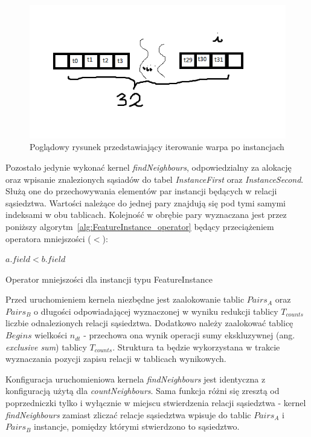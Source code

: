 \documentclass[12pt]{article}
\begin{document}
\begin{figure}[H]
\centering
\includegraphics{planesweep}
\caption{Poglądowy rysunek przedstawiający iterowanie warpa po instancjach}
\end{figure}

Pozostało jedynie wykonać kernel \textit{findNeighbours}, odpowiedzialny za alokację oraz wpisanie znalezionych sąsiadów do tabel \textit{InstanceFirst} oraz \textit{InstanceSecond}. Służą one do przechowywania elementów par instancji będących w relacji sąsiedztwa. Wartości należące do jednej pary znajdują się pod tymi samymi indeksami w obu tablicach. Kolejność w obrębie pary wyznaczana jest przez poniższy algorytm~\ref{alg:FeatureInstance_operator} będący przeciążeniem operatora mniejszości ($ < $):

\begin{algorithm}
 \Return $ a.field < b.field $ \;
\caption{Operator mniejszości dla instancji typu FeatureInstance}
\label{alg:FeatureInstance_operator}
\end{algorithm}

Przed uruchomieniem kernela niezbędne jest zaalokowanie tablic $ Pairs_{A} $ oraz $ Pairs_{B}$ o długości odpowiadającej wyznaczonej w wyniku redukcji tablicy $ T_{counts} $ liczbie odnalezionych relacji sąsiedztwa. Dodatkowo należy zaalokować tablicę $ Begins $ wielkości $ n_{dt} $ - przechowa ona wynik operacji sumy ekskluzywnej (ang. \textit{exclusive sum}) tablicy $ T_{counts} $. Struktura ta będzie wykorzystana w trakcie wyznaczania pozycji zapisu relacji w tablicach wynikowych.

Konfiguracja uruchomieniowa kernela \textit{findNeighbours} jest identyczna z konfiguracją użytą dla \textit{countNeighbours}. Sama funkcja różni się zresztą od poprzedniczki tylko i wyłącznie w miejscu stwierdzenia relacji sąsiedztwa - kernel \textit{findNeighbours} zamiast zliczać relacje sąsiedztwa wpisuje do tablic $ Pairs_{A} $ i $ Pairs_{B}$ instancje, pomiędzy którymi stwierdzono to sąsiedztwo.
\end{document}
